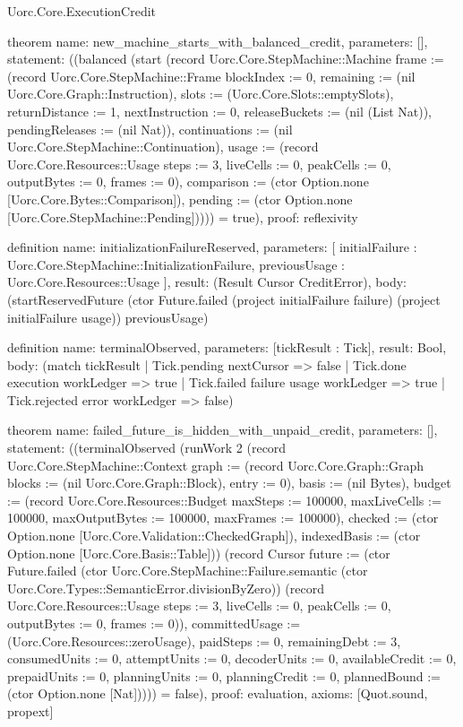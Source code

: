 \begin{lexlean}{Uorc.Core.ExecutionCredit}
\begin{semanticmodule}
theorem{
  name: new_machine_starts_with_balanced_credit,
  parameters: [],
  statement: ((balanced (start (record Uorc.Core.StepMachine::Machine {frame := (record Uorc.Core.StepMachine::Frame {blockIndex := 0, remaining := (nil Uorc.Core.Graph::Instruction), slots := (Uorc.Core.Slots::emptySlots), returnDistance := 1, nextInstruction := 0, releaseBuckets := (nil (List Nat)), pendingReleases := (nil Nat)}), continuations := (nil Uorc.Core.StepMachine::Continuation), usage := (record Uorc.Core.Resources::Usage {steps := 3, liveCells := 0, peakCells := 0, outputBytes := 0, frames := 0}), comparison := (ctor Option.none [Uorc.Core.Bytes::Comparison]), pending := (ctor Option.none [Uorc.Core.StepMachine::Pending])}))) = true),
  proof: reflexivity{}
}

definition{
  name: initializationFailureReserved,
  parameters: [
    initialFailure : Uorc.Core.StepMachine::InitializationFailure,
    previousUsage : Uorc.Core.Resources::Usage
  ],
  result: (Result Cursor CreditError),
  body: (startReservedFuture (ctor Future.failed (project initialFailure failure) (project initialFailure usage)) previousUsage)
}

definition{
  name: terminalObserved,
  parameters: [tickResult : Tick],
  result: Bool,
  body: (match tickResult
    | Tick.pending nextCursor => false
    | Tick.done execution workLedger => true
    | Tick.failed failure usage workLedger => true
    | Tick.rejected error workLedger => false)
}

theorem{
  name: failed_future_is_hidden_with_unpaid_credit,
  parameters: [],
  statement: ((terminalObserved (runWork 2 (record Uorc.Core.StepMachine::Context {graph := (record Uorc.Core.Graph::Graph {blocks := (nil Uorc.Core.Graph::Block), entry := 0}), basis := (nil Bytes), budget := (record Uorc.Core.Resources::Budget {maxSteps := 100000, maxLiveCells := 100000, maxOutputBytes := 100000, maxFrames := 100000}), checked := (ctor Option.none [Uorc.Core.Validation::CheckedGraph]), indexedBasis := (ctor Option.none [Uorc.Core.Basis::Table])}) (record Cursor {future := (ctor Future.failed (ctor Uorc.Core.StepMachine::Failure.semantic (ctor Uorc.Core.Types::SemanticError.divisionByZero)) (record Uorc.Core.Resources::Usage {steps := 3, liveCells := 0, peakCells := 0, outputBytes := 0, frames := 0})), committedUsage := (Uorc.Core.Resources::zeroUsage), paidSteps := 0, remainingDebt := 3, consumedUnits := 0, attemptUnits := 0, decoderUnits := 0, availableCredit := 0, prepaidUnits := 0, planningUnits := 0, planningCredit := 0, plannedBound := (ctor Option.none [Nat])}))) = false),
  proof: evaluation{},
  axioms: [Quot.sound, propext]
}


\end{semanticmodule}
\end{lexlean}
